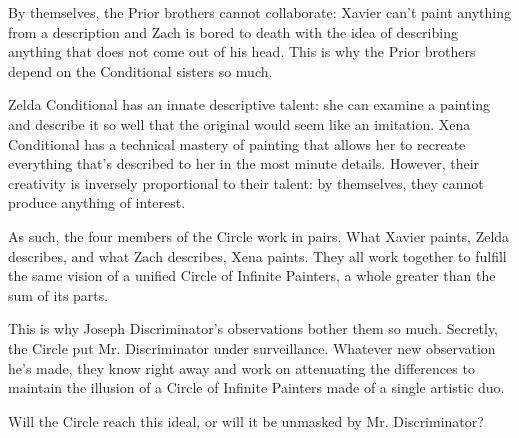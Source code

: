 \documentclass{article}
\begin{document}
By themselves, the Prior brothers cannot collaborate: Xavier can't paint
anything from a description and Zach is bored to death with the idea of
describing anything that does not come out of his head. This is why the Prior
brothers depend on the Conditional sisters so much.

Zelda Conditional has an innate descriptive talent: she can examine a painting
and describe it so well that the original would seem like an imitation. Xena
Conditional has a technical mastery of painting that allows her to recreate
everything that's described to her in the most minute details. However, their
creativity is inversely proportional to their talent: by themselves, they cannot
produce anything of interest.

As such, the four members of the Circle work in pairs. What Xavier paints, Zelda
describes, and what Zach describes, Xena paints. They all work together to
fulfill the same vision of a unified Circle of Infinite Painters, a whole greater
than the sum of its parts.

This is why Joseph Discriminator's observations bother them so much. Secretly,
the Circle put Mr. Discriminator under surveillance. Whatever new observation
he's made, they know right away and work on attenuating the differences to
maintain the illusion of a Circle of Infinite Painters made of a single artistic
duo.

Will the Circle reach this ideal, or will it be unmasked by Mr. Discriminator?
\end{document}

